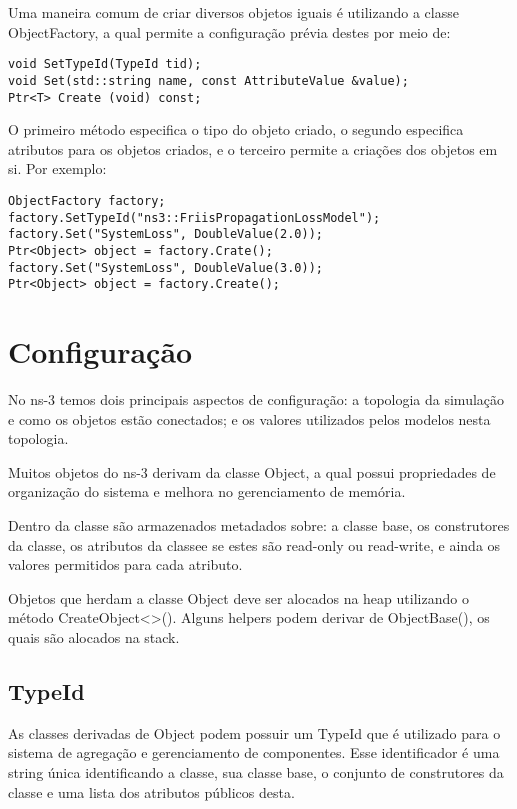 \documentclass[14pt]{extarticle}
\begin{document}
Uma maneira comum de criar diversos objetos iguais é utilizando a classe ObjectFactory, a qual permite a configuração
prévia destes por meio de:

\begin{lstlisting}
void SetTypeId(TypeId tid);
void Set(std::string name, const AttributeValue &value);
Ptr<T> Create (void) const;
\end{lstlisting}

O primeiro método especifica o tipo do objeto criado, o segundo especifica atributos para os objetos criados, e o
terceiro permite a criações dos objetos em si. Por exemplo:

\begin{lstlisting}
ObjectFactory factory;
factory.SetTypeId("ns3::FriisPropagationLossModel");
factory.Set("SystemLoss", DoubleValue(2.0));
Ptr<Object> object = factory.Crate();
factory.Set("SystemLoss", DoubleValue(3.0));
Ptr<Object> object = factory.Create();
\end{lstlisting}

\section{Configuração}
No ns-3 temos dois principais aspectos de configuração: a topologia da simulação e como os objetos estão conectados; e
os valores utilizados pelos modelos nesta topologia.

Muitos objetos do ns-3 derivam da classe Object, a qual possui propriedades de organização do sistema e melhora no
gerenciamento de memória.

Dentro da classe são armazenados metadados sobre: a classe base, os construtores da classe, os atributos da classee se
estes são read-only ou read-write, e ainda os valores permitidos para cada atributo.

Objetos que herdam a classe Object deve ser alocados na heap utilizando o método CreateObject<>(). Alguns helpers podem
derivar de ObjectBase(), os quais são alocados na stack.

\subsection{TypeId}

As classes derivadas de Object podem possuir um TypeId que é utilizado para o sistema de agregação e gerenciamento de
componentes. Esse identificador é uma string única identificando a classe, sua classe base, o conjunto de construtores
da classe e uma lista dos atributos públicos desta.
\end{document}
